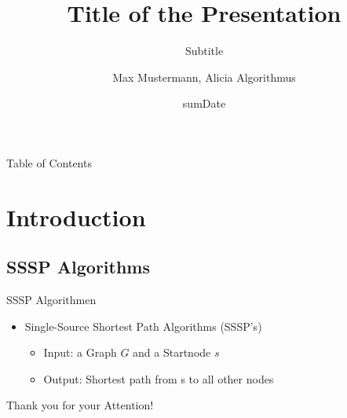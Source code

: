 \documentclass{beamer}
\title[titleAbbreviation]{Title of the Presentation}
\subtitle{Subtitle}
\author[M. Mustermann, A. Algorithmus]{Max Mustermann, Alicia Algorithmus}
\date[sumDate]{sumDate}
\institute[XXX]{
    Computer Science Department\\
    University of X
}
\begin{document}
\begin{frame}
    \titlepage
\end{frame}


\begin{frame}{Table of Contents}
    \tableofcontents[]
\end{frame}

\section{Introduction}

\subsection{SSSP Algorithms}

\begin{frame}{SSSP Algorithmen}
    \begin{itemize}
        \item<1-> Single-Source Shortest Path Algorithms (SSSP's) 
        \begin{itemize}
            \item<2-> Input: a Graph $G$ and a Startnode $s$
            \item<2-> Output: Shortest path from s to all other nodes
        \end{itemize}
    \end{itemize}
\end{frame}


\begin{frame}[plain]
    \hypertarget{endearly}{}
    \begin{center}
        \vspace{2.5cm}
        \Huge \color{teal}Thank you for your Attention!
        \vspace{1.25cm}
    \end{center}
\end{frame}
\end{document}
